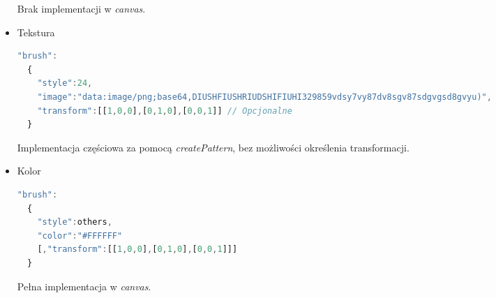 \begin{itemize}
Brak implementacji w \emph{canvas}.

\item Tekstura
\begin{lstlisting}[language=JavaScript,numbers=none]
"brush":			
  {
    "style":24,
    "image":"data:image/png;base64,DIUSHFIUSHRIUDSHIFIUHI329859vdsy7vy87dv8sgv87sdgvgsd8gvyu)",
    "transform":[[1,0,0],[0,1,0],[0,0,1]] // Opcjonalne
  }
\end{lstlisting}

Implementacja częściowa za pomocą \emph{createPattern}, bez możliwości określenia transformacji.

\item Kolor
\begin{lstlisting}[language=JavaScript,numbers=none]	      	 "brush":			
  {
    "style":others,
    "color":"#FFFFFF"
    [,"transform":[[1,0,0],[0,1,0],[0,0,1]]]
  }
\end{lstlisting}

Pełna implementacja w \emph{canvas}.

\end{itemize}

